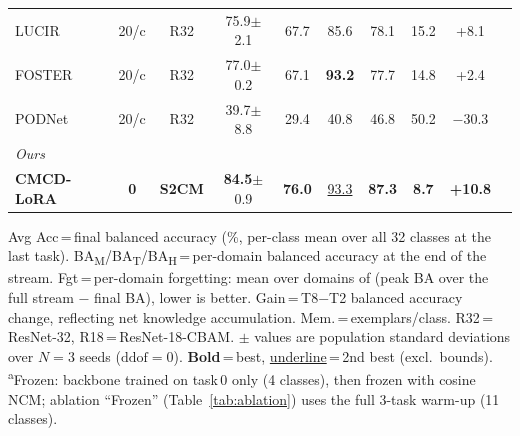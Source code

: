 \begin{table}[t]
{\begin{tabular}{l c c c c c c c c c}
LUCIR  & 20/c & R32 & 75.9{\scriptsize$\pm$2.1} & 67.7 & 85.6 & 78.1 & 15.2 & +8.1 \\
FOSTER & 20/c & R32 & 77.0{\scriptsize$\pm$0.2} & 67.1 & \textbf{93.2} & 77.7 & 14.8 & +2.4 \\
PODNet & 20/c & R32 & 39.7{\scriptsize$\pm$8.8} & 29.4 & 40.8 & 46.8 & 50.2 & $-$30.3 \\
\midrule
\multicolumn{9}{l}{\textit{Ours}} \\
\rowcolor{red!5}
\textbf{CMCD-LoRA} & \textbf{0} & \textbf{S2CM} & \textbf{84.5}{\scriptsize$\pm$0.9} & \textbf{76.0} & \underline{93.3} & \textbf{87.3} & \textbf{8.7} & \textbf{+10.8} \\
\bottomrule
\end{tabular}%
}

\vspace{2pt}
{\footnotesize Avg Acc\,=\,final balanced accuracy (\%, per-class mean over all 32 classes at the last task). BA\textsubscript{M}/BA\textsubscript{T}/BA\textsubscript{H}\,=\,per-domain balanced accuracy at the end of the stream. Fgt\,=\,per-domain forgetting: mean over domains of (peak BA over the full stream $-$ final BA), lower is better. Gain\,=\,T8$-$T2 balanced accuracy change, reflecting net knowledge accumulation. Mem.\,=\,exemplars/class. R32\,=\,ResNet-32, R18\,=\,ResNet-18-CBAM. $\pm$ values are population standard deviations over $N{=}3$ seeds ($\mathrm{ddof}{=}0$). \textbf{Bold}\,=\,best, \underline{underline}\,=\,2nd best (excl.\ bounds). \textsuperscript{a}Frozen: backbone trained on task\,0 only (4 classes), then frozen with cosine NCM; ablation ``Frozen'' (Table~\ref{tab:ablation}) uses the full 3-task warm-up (11 classes).}
\end{table}
